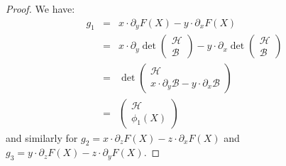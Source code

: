 \documentclass{amsart}
\theoremstyle{plain}
\theoremstyle{definition}
\newcommand{\de}{\partial}
\begin{document}
\begin{proof} We have:
\begin{eqnarray*}
g_1 & =  & x \cdot \de_y F(X)- y \cdot \de_xF(X) \\
& = &
x\cdot \de_y \det \left( \begin{array}{c} \mathcal{H}\\ \mathcal{B}
\end{array} \right) -y \cdot
\de_x \det \left( \begin{array}{c} \mathcal{H}\\ \mathcal{B}
\end{array} \right) \\
& = & \det \left( \begin{array}{c} \mathcal{H}\\ x \cdot \de_y \mathcal{B}-
y \cdot \de_x \mathcal{B}
\end{array} \right)\\
& = & \left( \begin{array}{c} \mathcal{H}\\
\phi_1(X)
\end{array} \right)
\end{eqnarray*}
and similarly for $g_2 = x \cdot \de_z F(X)- z \cdot \de_xF(X)$
and $g_3 = y \cdot \de_z F(X)- z \cdot \de_yF(X)$.
\end{proof}
\end{document}

